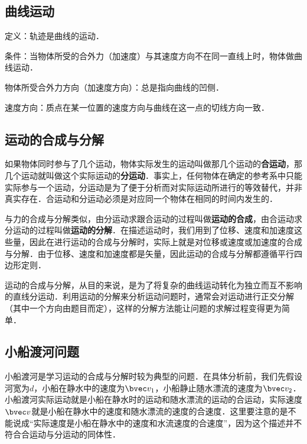 
\begin{issues}
\issueDraft
\issueTODO
\end{issues}

\subsection{曲线运动}

定义：轨迹是曲线的运动．

条件：当物体所受的合外力（加速度）与其速度方向不在同一直线上时，物体做曲线运动．

物体所受合外力方向（加速度方向）：总是指向曲线的凹侧．

速度方向：质点在某一位置的速度方向与曲线在这一点的切线方向一致．

\subsection{运动的合成与分解}

如果物体同时参与了几个运动，物体实际发生的运动叫做那几个运动的\textbf{合运动}，那几个运动就叫做这个实际运动的\textbf{分运动}．事实上，任何物体在确定的参考系中只能实际参与一个运动，分运动是为了便于分析而对实际运动所进行的等效替代，并非真实存在．合运动和分运动必须是对应同一个物体在相同的时间内发生的．

与力的合成与分解类似，由分运动求跟合运动的过程叫做\textbf{运动的合成}，由合运动求分运动的过程叫做\textbf{运动的分解}．在描述运动时，我们用到了位移、速度和加速度这些量，因此在进行运动的合成与分解时，实际上就是对位移或速度或加速度的合成与分解．由于位移、速度和加速度都是矢量，因此运动的合成与分解都遵循平行四边形定则．

运动的合成与分解，从目的来说，是为了将复杂的曲线运动转化为独立而互不影响的直线分运动．利用运动的分解来分析运动问题时，通常会对运动进行正交分解（其中一个方向由题目而定），这样的分解方法能让问题的求解过程变得更为简单．

\subsection{小船渡河问题}

小船渡河是学习运动的合成与分解时较为典型的问题．在具体分析前，我们先假设河宽为$d$，小船在静水中的速度为$\bvec v_1$，小船静止随水漂流的速度为$\bvec v_2$．小船渡河实际运动就是小船在静水时的运动和随水漂流的运动的合运动，实际速度$\bvec v$就是小船在静水中的速度和随水漂流的速度的合速度．这里要注意的是不能说成“实际速度是小船在静水中的速度和水流速度的合速度”，因为这个描述并不符合合运动与分运动的同体性．

